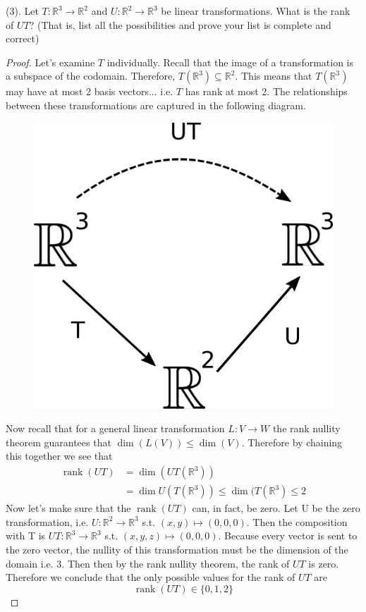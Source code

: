 \documentclass[a4paper, 11pt]{article}
\newcommand{\R}{\mathbb{R}}
\newenvironment{solution}{%
	\begin{list}{}{%
			\setlength{\topsep}{0pt}%
			\setlength{\leftmargin}{1.5cm}%
			\setlength{\rightmargin}{1.5cm}%
			\setlength{\listparindent}{\parindent}%
			\setlength{\itemindent}{\parindent}%
			\setlength{\parsep}{\parskip}%
		}%
		\item[]}{\end{list}}
\begin{document}
\noindent(3). Let $T:\R^3\to \R^2$ and $U:\R^2\to \R^3$ be linear transformations. What is the rank of $UT$? (That is, list all the possibilities and prove your list is complete and correct)\\
	\begin{solution}
		\begin{proof}
		\noindent Let's examine $T$ individually. Recall that the image of a transformation is a subspace of the codomain. Therefore, $T(\R^3)\subseteq \R^2$. This means that $T(\R^3)$ may have at most 2 basis vectors... i.e. $T$ has rank at most 2. The relationships between these transformations are captured in the following diagram.
		
			\begin{figure}[!hbt]
				\centering
				\includegraphics[width=0.25\columnwidth]{compositionDiagram}
			\end{figure}
		
		\noindent Now recall that for a general linear transformation $L:V \to W$ the rank nullity theorem guarantees that $\dim(L(V))\leq \dim(V)$. Therefore by chaining this together we see that
			\begin{align*}
				\operatorname{rank}(UT) &= \dim(UT(\R^3)) \\ 
					&= \dim U(T(\R^3)) \leq \dim(T(\R^3) \leq 2
			\end{align*}
		Now let's make sure that the $\operatorname{rank}(UT)$ can, in fact, be zero. Let U be the zero transformation, i.e. $U:\R^2\to\R^3$ s.t. $(x,y)\mapsto(0,0,0)$. Then the composition with T is $UT:\R^3\to\R^3$ s.t. $(x,y,z)\mapsto(0,0,0)$. Because every vector is sent to the zero vector, the nullity of this transformation must be the dimension of the domain i.e. 3. Then then by the rank nullity theorem, the rank of $UT$ is zero. \\
		
		\noindent Therefore we conclude that the only possible values for the rank of $UT$ are
			\begin{equation*}
				\operatorname{rank}(UT) \in \{0, 1, 2\} 
			\end{equation*}
		\end{proof}
	\end{solution}
\end{document}
